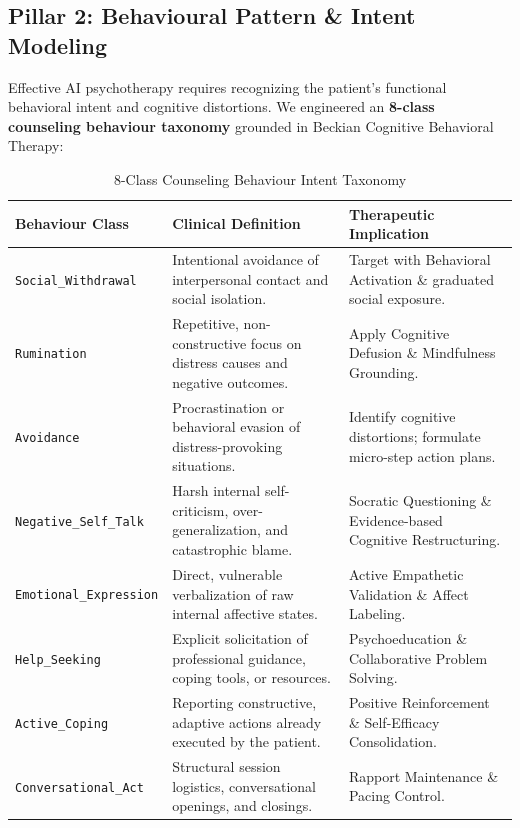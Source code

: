 \documentclass[11pt,a4paper]{article}
\begin{document}
\subsection{Pillar 2: Behavioural Pattern \& Intent Modeling}
Effective AI psychotherapy requires recognizing the patient's functional behavioral intent and cognitive distortions. We engineered an \textbf{8-class counseling behaviour taxonomy} grounded in Beckian Cognitive Behavioral Therapy:

\begin{table}[H]
\centering
\small
\sffamily
\caption{8-Class Counseling Behaviour Intent Taxonomy}
\label{tab:behaviour_tax}
\begin{tabularx}{\linewidth}{p{3.5cm}Xp{4.2cm}}
\toprule
\textbf{Behaviour Class} & \textbf{Clinical Definition} & \textbf{Therapeutic Implication} \\
\midrule
\texttt{Social\_Withdrawal} & Intentional avoidance of interpersonal contact and social isolation. & Target with Behavioral Activation \& graduated social exposure. \\
\texttt{Rumination} & Repetitive, non-constructive focus on distress causes and negative outcomes. & Apply Cognitive Defusion \& Mindfulness Grounding. \\
\texttt{Avoidance} & Procrastination or behavioral evasion of distress-provoking situations. & Identify cognitive distortions; formulate micro-step action plans. \\
\texttt{Negative\_Self\_Talk} & Harsh internal self-criticism, over-generalization, and catastrophic blame. & Socratic Questioning \& Evidence-based Cognitive Restructuring. \\
\texttt{Emotional\_Expression} & Direct, vulnerable verbalization of raw internal affective states. & Active Empathetic Validation \& Affect Labeling. \\
\texttt{Help\_Seeking} & Explicit solicitation of professional guidance, coping tools, or resources. & Psychoeducation \& Collaborative Problem Solving. \\
\texttt{Active\_Coping} & Reporting constructive, adaptive actions already executed by the patient. & Positive Reinforcement \& Self-Efficacy Consolidation. \\
\texttt{Conversational\_Act} & Structural session logistics, conversational openings, and closings. & Rapport Maintenance \& Pacing Control. \\
\bottomrule
\end{tabularx}
\end{table}
\end{document}
